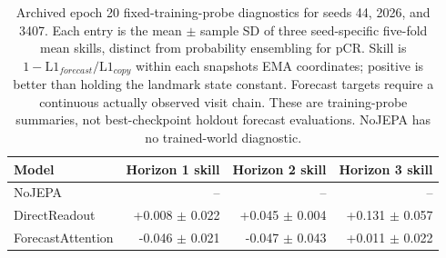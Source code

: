 \begin{table}[t]
\centering
\small
\caption{Archived epoch 20 fixed-training-probe diagnostics for seeds 44, 2026, and 3407. Each entry is the mean $\pm$ sample SD of three seed-specific five-fold mean skills, distinct from probability ensembling for pCR. Skill is $1-\mathrm{L1}_{forecast}/\mathrm{L1}_{copy}$ within each snapshot\textquotesingle s EMA coordinates; positive is better than holding the landmark state constant. Forecast targets require a continuous actually observed visit chain. These are training-probe summaries, not best-checkpoint holdout forecast evaluations. NoJEPA has no trained-world diagnostic.}
\label{tab:worldprobe}
\begin{tabular}{lrrr}
\toprule
Model & Horizon 1 skill & Horizon 2 skill & Horizon 3 skill \\
\midrule
NoJEPA & -- & -- & -- \\
DirectReadout & +0.008 $\pm$ 0.022 & +0.045 $\pm$ 0.004 & +0.131 $\pm$ 0.057 \\
ForecastAttention & -0.046 $\pm$ 0.021 & -0.047 $\pm$ 0.043 & +0.011 $\pm$ 0.022 \\
\bottomrule
\end{tabular}
\end{table}
